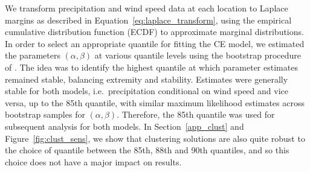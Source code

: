 \documentclass[12pt]{article}
\DeclareMathOperator{\CE}{\mathrm{CE}}
\begin{document}
We transform precipitation and wind speed data at each location to Laplace margins as described in Equation~\eqref{eq:laplace_transform}, using the empirical cumulative distribution function (ECDF) to approximate marginal distributions.  
In order to select an appropriate quantile for fitting the CE model, we estimated the parameters $(\alpha, \beta)$ at various quantile levels using the bootstrap procedure of \citet{Heffernan2004}. 
The idea was to identify the highest quantile at which parameter estimates remained stable, balancing extremity and stability.
Estimates were generally stable for both models, i.e.\ precipitation conditional on wind speed and vice versa, up to the 85th quantile, with similar maximum likelihood estimates across bootstrap samples for $(\alpha, \beta)$. %
Therefore, the 85th quantile was used for subsequent analysis for both models.
In Section~\ref{app_clust} and Figure~\ref{fig:clust_sens}, we show that clustering solutions are also quite robust to the choice of quantile between the 85th, 88th and 90th quantiles, and so this choice does not have a major impact on results.
\end{document}
